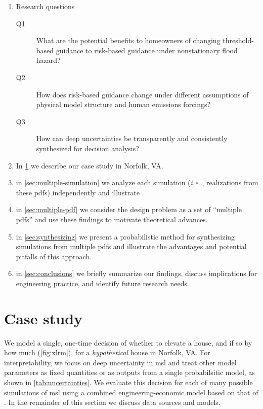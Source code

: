 \documentclass[12pt]{article}
\makeatletter
\DeclareRobustCommand\onedot{\futurelet\@let@token\@onedot}
\def\@onedot{\ifx\@let@token.\else.\null\fi\xspace}
\def\ie{\emph{i.e}\onedot} \def\Ie{\emph{I.e}\onedot}
\DeclareRobustCommand\onedot{\futurelet\@let@token\@onedot}
\def\@onedot{\ifx\@let@token.\else.\null\fi\xspace}
\def\ie{\emph{i.e}\onedot} \def\Ie{\emph{I.e}\onedot}
\makeatother
\begin{document}
\begin{enumerate}
    \item Research questions
          \begin{description}
              \item[Q1] What are the potential benefits to homeowners of changing threshold-based guidance to risk-based guidance under nonstationary flood hazard?
              \item[Q2] How does risk-based guidance change under different assumptions of physical model structure and human emissions forcings?
              \item[Q3] How can deep uncertainties be transparently and consistently synthesized for decision analysis?
          \end{description}
    \item In \cref{sec:case-study} we describe our case study in Norfolk, VA.
    \item  in \cref{sec:multiple-simulation} we analyze each simulation (\ie, realizations from these \glspl{pdf}) independently and illustrate .
    \item  in \cref{sec:multiple-pdf} we consider the design problem as a set of ``multiple \glspl{pdf}'' and use these findings to motivate theoretical advances.
    \item  in \cref{sec:synthesizing} we present a probabilistic method for synthesizing simulations from multiple \glspl{pdf} and illustrate the advantages and potential pitfalls of this approach.
    \item  in \cref{sec:conclusions} we briefly summarize our findings, discuss implications for engineering practice, and identify  future research needs.
\end{enumerate}


\section{Case study}\label{sec:case-study}

We model a single, one-time decision of whether to elevate a house, and if so by how much (\cref{fig:xlrm}), for a \emph{hypothetical} house in Norfolk, VA.
For interpretability, we focus on deep uncertainty in \gls{msl} and treat other model parameters as fixed quantities or as outputs from a single probabilsitic model, as shown in \cref{tab:uncertainties}.
We evaluate this decision for each of many possible simulations of \gls{msl} using a combined engineering-economic model based on that of \citet{zarekarizi_suboptimal:2020}.
In the remainder of this section we discuss data sources and models.
\end{document}
